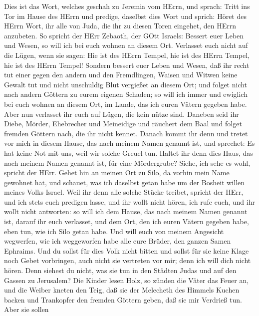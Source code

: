  Dies ist das Wort, welches geschah zu Jeremia vom HErrn,
und sprach:  Tritt ins Tor im Hause des HErrn und predige,
daselbst dies Wort und sprich: Höret des HErrn Wort, ihr alle von Juda,
die ihr zu diesen Toren eingehet, den HErrn anzubeten.  So
spricht der HErr Zebaoth, der GOtt Israels: Bessert euer Leben und
Wesen, so will ich bei euch wohnen an diesem Ort.  Verlasset
euch nicht auf die Lügen, wenn sie sagen: Hie ist des HErrn Tempel, hie
ist des HErrn Tempel, hie ist des HErrn Tempel!  Sondern
bessert euer Leben und Wesen, daß ihr recht tut einer gegen den andern
 und den Fremdlingen, Waisen und Witwen keine Gewalt tut und
nicht unschuldig Blut vergießet an diesem Ort; und folget nicht nach
andern Göttern zu eurem eigenen Schaden;  so will ich immer
und ewiglich bei euch wohnen an diesem Ort, im Lande, das ich euren
Vätern gegeben habe.  Aber nun verlasset ihr euch auf Lügen,
die kein nütze sind.  Daneben seid ihr Diebe, Mörder,
Ehebrecher und Meineidige und räuchert dem Baal und folget fremden
Göttern nach, die ihr nicht kennet.  Danach kommt ihr denn
und tretet vor mich in diesem Hause, das nach meinem Namen genannt ist,
und sprechet: Es hat keine Not mit uns, weil wir solche Greuel tun.
 Haltet ihr denn dies Haus, das nach meinem Namen genannt
ist, für eine Mördergrube? Siehe, ich sehe es wohl, spricht der HErr.
 Gehet hin an meinen Ort zu Silo, da vorhin mein Name
gewohnet hat, und schauet, was ich daselbst getan habe um der Bosheit
willen meines Volks Israel.  Weil ihr denn alle solche
Stücke treibet, spricht der HErr, und ich stets euch predigen lasse, und
ihr wollt nicht hören, ich rufe euch, und ihr wollt nicht antworten:
 so will ich dem Hause, das nach meinem Namen genannt ist,
darauf ihr euch verlasset, und dem Ort, den ich euren Vätern gegeben
habe, eben tun, wie ich Silo getan habe.  Und will euch von
meinem Angesicht wegwerfen, wie ich weggeworfen habe alle eure Brüder,
den ganzen Samen Ephraims.  Und du sollst für dies Volk
nicht bitten und sollst für sie keine Klage noch Gebet vorbringen, auch
nicht sie vertreten vor mir; denn ich will dich nicht hören.
 Denn siehest du nicht, was sie tun in den Städten Judas
und auf den Gassen zu Jerusalem?  Die Kinder lesen Holz, so
zünden die Väter das Feuer an, und die Weiber kneten den Teig, daß sie
der Melecheth des Himmels Kuchen backen und Trankopfer den fremden
Göttern geben, daß sie mir Verdrieß tun.  Aber sie sollen
